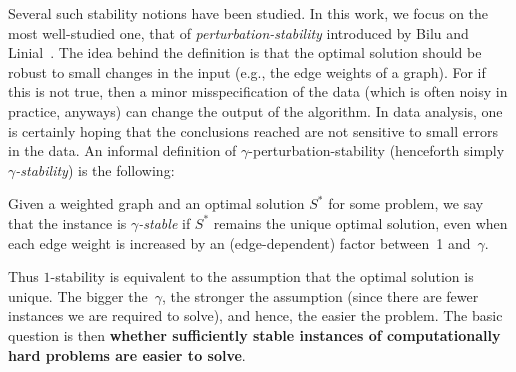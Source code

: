 Several such stability notions have been studied.
In this work, we focus on the most well-studied one, that of {\em
  perturbation-stability}
introduced by Bilu and Linial~\cite{bilu2012stable}.
The idea behind the definition is that the optimal solution should be
robust to small changes in the input (e.g., the edge weights of a
graph).  For if this is not true, then a minor misspecification of the
data (which is often noisy in practice, anyways) can change the output of
the algorithm.  
In data analysis, one is certainly
hoping that the conclusions reached are not sensitive to small errors
in the data.
%
An informal definition of $\gamma$-perturbation-stability (henceforth
simply {\em $\gamma$-stability}) is the following:
\begin{definition}  Given a weighted graph and an
  optimal solution $S^*$ for some problem, we say that the instance is
  {\em $\gamma$-stable} if $S^*$ remains the unique optimal solution, even
  when each edge weight is increased by an (edge-dependent) factor
  between~1 and~$\gamma$.
\end{definition}
Thus $1$-stability is equivalent to the assumption that the
optimal solution is unique.  The bigger the~$\gamma$, the stronger the
assumption (since there are fewer instances we are required to solve), and hence, the easier the problem.
The basic question is then \textbf{whether sufficiently stable
  instances of computationally hard problems are easier to
  solve}. 
